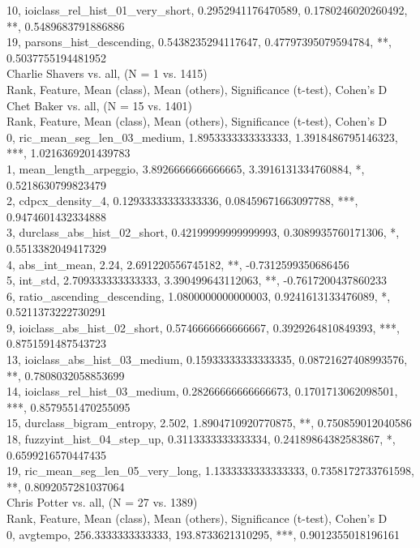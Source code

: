 10, ioiclass_rel_hist_01_very_short, 0.2952941176470589, 0.1780246020260492, **, 0.5489683791886886\\
19, parsons_hist_descending, 0.5438235294117647, 0.47797395079594784, **, 0.5037755194481952\\
Charlie Shavers vs. all, (N = 1 vs. 1415)\\
Rank, Feature, Mean (class), Mean (others), Significance (t-test), Cohen's D\\
Chet Baker vs. all, (N = 15 vs. 1401)\\
Rank, Feature, Mean (class), Mean (others), Significance (t-test), Cohen's D\\
0, ric_mean_seg_len_03_medium, 1.8953333333333333, 1.3918486795146323, ***, 1.0216369201439783\\
1, mean_length_arpeggio, 3.8926666666666665, 3.3916131334760884, *, 0.5218630799823479\\
2, cdpcx_density_4, 0.12933333333333336, 0.08459671663097788, ***, 0.9474601432334888\\
3, durclass_abs_hist_02_short, 0.42199999999999993, 0.3089935760171306, *, 0.5513382049417329\\
4, abs_int_mean, 2.24, 2.691220556745182, **, -0.7312599350686456\\
5, int_std, 2.709333333333333, 3.390499643112063, **, -0.7617200437860233\\
6, ratio_ascending_descending, 1.0800000000000003, 0.9241613133476089, *, 0.5211373222730291\\
9, ioiclass_abs_hist_02_short, 0.5746666666666667, 0.3929264810849393, ***, 0.8751591487543723\\
13, ioiclass_abs_hist_03_medium, 0.15933333333333335, 0.08721627408993576, **, 0.7808032058853699\\
14, ioiclass_rel_hist_03_medium, 0.28266666666666673, 0.1701713062098501, ***, 0.8579551470255095\\
15, durclass_bigram_entropy, 2.502, 1.8904710920770875, **, 0.750859012040586\\
18, fuzzyint_hist_04_step_up, 0.3113333333333334, 0.24189864382583867, *, 0.6599216570447435\\
19, ric_mean_seg_len_05_very_long, 1.1333333333333333, 0.7358172733761598, **, 0.8092057281037064\\
Chris Potter vs. all, (N = 27 vs. 1389)\\
Rank, Feature, Mean (class), Mean (others), Significance (t-test), Cohen's D\\
0, avgtempo, 256.3333333333333, 193.8733621310295, ***, 0.9012355018196161\\
